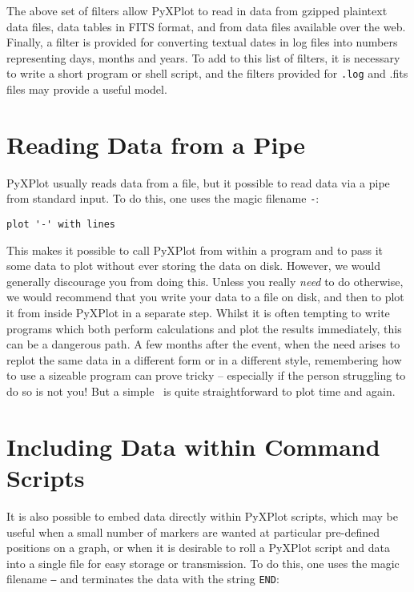 The above set of filters allow PyXPlot to read in data from gzipped plaintext
data files, data tables in FITS format, and from data files available over the
web. Finally, a filter is provided for converting textual dates in log files
into numbers representing days, months and years. To add to this list of
filters, it is necessary to write a short program or shell script, and the
filters provided for {\tt .log} and {.fits} files may provide a useful model.

\section{Reading Data from a Pipe}

PyXPlot usually reads data from a file, but it possible to read data via a pipe
from standard input.  To do this, one uses the magic filename {\tt -}:

\begin{verbatim}
plot '-' with lines
\end{verbatim}

This makes it possible to call PyXPlot from within a program and to pass it
some data to plot without ever storing the data on disk.  However, we would
generally discourage you from doing this. Unless you really {\it need} to do
otherwise, we would recommend that you write your data to a file on disk, and
then to plot it from inside PyXPlot in a separate step.  Whilst it is often
tempting to write programs which both perform calculations and plot the results
immediately, this can be a dangerous path. A few months after the event, when
the need arises to replot the same data in a different form or in a different
style, remembering how to use a sizeable program can prove tricky -- especially
if the person struggling to do so is not you! But a simple \datafile\ is quite
straightforward to plot time and again.

\section{Including Data within Command Scripts}

It is also possible to embed data directly within PyXPlot scripts, which may be
useful when a small number of markers are wanted at particular pre-defined
positions on a graph, or when it is desirable to roll a PyXPlot script and data
into a single file for easy storage or transmission. To do this, one uses the
magic filename {\tt --} and terminates the data with the string {\tt END}:

